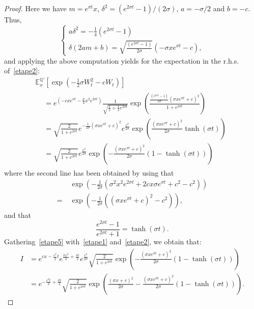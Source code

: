 \documentclass[AHL,Unicode,longabstracts,published]{cedram}
\newcommand*\E{\mathbb{E}}
\newcommand{\bbQ}{\mathbb{Q}}
\begin{document}
\begin{proof}
Here we have $m=e^{\sigma t}x$, $\delta^2=(e^{2\sigma t}-1)/(2\sigma)$, $a=-\sigma/2$ and $b=-c$. Thus,
\[
\begin{cases}
a\delta^2=-\frac{1}{4}\left(e^{2\sigma t}-1 \right)\\
\delta(2am+b)=\sqrt{\frac{\left(e^{2\sigma t}-1\right)}{2\sigma}}\left(-\sigma x e^{\sigma t}-c \right),
\end{cases}
\]
and applying the above computation yields for the expectation in the r.h.s. of~\eqref{etape2}:
\begin{multline}\label{etape5}
\E_{x}^{\bbQ'}\left[\exp\left(-\frac{1}{2}\sigma W_{t}^2-c W_{t} \right) \right]\\
\begin{aligned}
&= e^{\left(-cxe^{\sigma t}-\frac{\sigma}{2}x^2e^{2\sigma t}\right)}\frac{1}{\sqrt{\frac{1}{2}+\frac{1}{2}e^{2\sigma t}}}\exp\left(\frac{\frac{\left(e^{2\sigma t}-1\right)}{2\sigma}\left(\sigma x e^{\sigma t}+c \right)^2}{1+e^{2\sigma t}} \right)\\
 &= \sqrt{\frac{2}{1+e^{2\sigma t}}} e^{-\frac{1}{2\sigma} \left(\sigma x e^{\sigma t}+c\right)^2 } e^{\frac{c^2}{2\sigma}}\exp\left(\frac{\left(\sigma x e^{\sigma t}+c\right)^2}{2\sigma}\tanh\left(\sigma t\right)\right)\\
& = \sqrt{\frac{2}{1+e^{2\sigma t}}} e^{\frac{c^2}{2\sigma}}\exp\left(-\frac{\left(\sigma x e^{\sigma t}+c\right)^2}{2\sigma}\left(1-\tanh(\sigma t)\right)\right)
\end{aligned}
\end{multline}
where the second line has been obtained by using that
\begin{align*}
&\exp\left(-\frac{1}{2\sigma}\left(\sigma^2 x^2e^{2\sigma t}+2cx\sigma e^{\sigma t}+c^2-c^2\right)\right)\\
=\; &\exp\left(-\frac{1}{2\sigma}\left(\left(\sigma xe^{\sigma t}+c\right)^2-c^2\right)\right),
\end{align*}
and that
\[
\frac{e^{2\sigma t}-1}{e^{2\sigma t}+1}=\tanh(\sigma t).
\]
Gathering~\eqref{etape5} with~\eqref{etape1} and~\eqref{etape2}, we obtain that:
\begin{align*}
I &=e^{cx-\frac{c^2}{2}t} e^{\frac{\sigma x^2}{2}+\frac{\sigma t}{2}} e^{\frac{c^2}{2\sigma}}\sqrt{\frac{2}{1+e^{2\sigma t}}}\exp\left(-\frac{\left(\sigma xe^{\sigma t}+c \right)^2}{2\sigma}\left(1-\tanh(\sigma t)\right) \right)\\
&=e^{-\frac{c^2t}{2}+\frac{\sigma t}{2}}\sqrt{\frac{2}{1+e^{2\sigma t}}}\exp\left(\frac{(\sigma x+c)^2}{2\sigma}-\frac{\left(\sigma xe^{\sigma t}+c \right)^2}{2\sigma}\left(1-\tanh(\sigma t)\right) \right).

\end{align*}
\end{proof}
\end{document}
